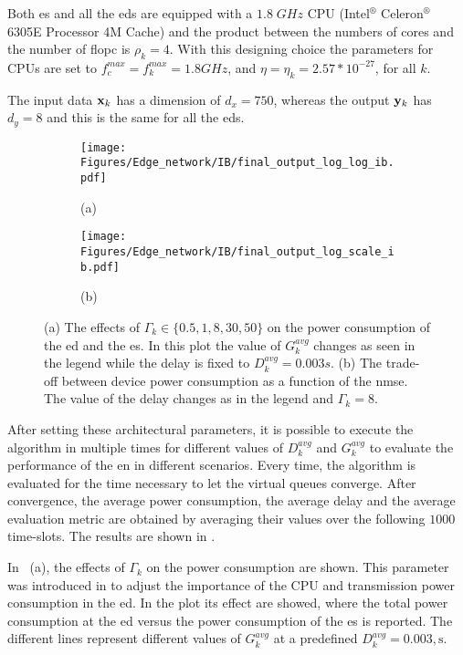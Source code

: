 Both \gls{es} and all the \glspl{ed} are equipped with a $1.8 \; GHz $ CPU (Intel$^{\circledR}$ Celeron$^{\circledR}$  6305E Processor 4M Cache) and the product between the numbers of cores and the number of \gls{flopc} is $\rho_k=4$. With this designing choice the parameters for CPUs are set to $ f_c^{max} = f_k^{max} = 1.8GHz $, and $  \eta = \eta_k = 2.57*10 ^ {-27} $, for all $k$. 

The input data $\mathbf{x}_k$ has a dimension of $d_x=750$, whereas the output $\mathbf{y}_k$ has $d_y=8$ and this is the same for all the \glspl{ed}. \\
\begin{figure}[!t]
    \centering
    \begin{subfigure}[t]{0.49\textwidth}
        \centering
        \texttt{[image: Figures/Edge\_network/IB/final\_output\_log\_log\_ib.pdf]}
        \caption*{(a)} %
    \end{subfigure}%
    \begin{subfigure}[t]{0.49\textwidth}
        \centering
        \texttt{[image: Figures/Edge\_network/IB/final\_output\_log\_scale\_ib.pdf]}
        \caption*{(b)}
    \end{subfigure}
    \caption[Goal-Oriented communication Edge Network trade-off plots ]{(a) The effects of $\Gamma_k\in \{0.5, 1, 8, 30, 50\}$ on the power consumption of the \gls{ed} and the \gls{es}. In this plot the value of $G_k^{avg}$ changes as seen in the legend while the delay is fixed to $D_k^{avg}= 0.003s$. (b) The trade-off between device power consumption as a function of the \gls{nmse}. The value of the delay changes as in the legend and $\Gamma_k=8$.}
    \label{fig: EN_ib trade-off}
\end{figure}

After setting these architectural parameters, it is possible to execute the algorithm in  multiple times for different values of $D_k^{avg}$ and $G_k^{avg}$ to evaluate the performance of the \gls{en} in different scenarios. Every time, the algorithm is evaluated for the time necessary to let the virtual queues converge. After convergence, the average power consumption, the average delay and the average evaluation metric are obtained by averaging their values over the following $1000$ time-slots. The results are shown in .

In ~(a), the effects of $\Gamma_k$ on the power consumption are shown. This parameter was introduced in  to adjust the importance of the CPU and transmission power consumption in the \gls{ed}. In the plot its effect are showed, where the total power consumption at the \gls{ed} versus the power consumption of the \gls{es} is reported. The different lines represent different values of $G_k^{avg}$ at a predefined $D_k^{avg}=0.003,\text{s}$.

